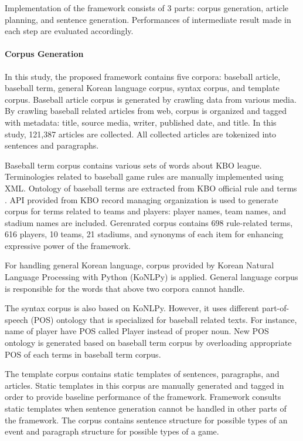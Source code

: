 \documentclass[11pt,letterpaper]{article}
\begin{document}
Implementation of the framework consists of 3 parts: corpus generation, article planning, and sentence generation. Performances of intermediate result made in each step are evaluated accordingly. 

\paragraph{Corpus Generation} 

In this study, the proposed framework contains five corpora: baseball article, baseball term, general Korean language corpus, syntax corpus, and template corpus. 
Baseball article corpus is generated by crawling data from various media. By crawling baseball related articles from web, corpus is organized and tagged with metadata: title, source media, writer, published date, and title. In this study, 121,387 articles are collected. All collected articles are tokenized into sentences and paragraphs. 

Baseball term corpus contains various sets of words about KBO league. Terminologies related to baseball game rules are manually implemented using XML. Ontology of baseball terms are extracted from KBO official rule and terms \cite{kbo}.  API provided from KBO record managing organization is used to generate corpus for terms related to teams and players: player names, team names, and stadium names are included. Gerenrated corpus contains 698 rule-related terms, 616 players, 10 teams, 21 stadiums, and synonyms of each item for enhancing expressive power of the framework. 

For handling general Korean language, corpus provided by Korean Natural Language Processing with Python (KoNLPy) is applied. General language corpus is responsible for the words that above two corpora cannot handle. 

The syntax corpus is also based on KoNLPy. However, it uses different part-of-speech (POS) ontology that is specialized for baseball related texts. For instance, name of player have POS called Player instead of proper noun. New POS ontology is generated based on baseball term corpus by overloading appropriate POS of each terms in baseball term corpus. 

The template corpus contains static templates of sentences, paragraphs, and articles. Static templates in this corpus are manually generated and tagged in order to provide baseline performance of the framework. Framework consults static templates when sentence generation cannot be handled in other parts of the framework. The corpus contains sentence structure for possible types of an event and paragraph structure for possible types of a game. 
\end{document}
